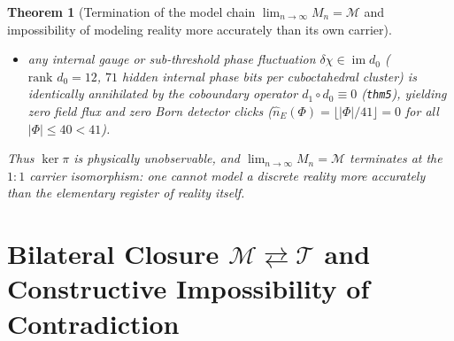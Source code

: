 \documentclass[11pt,a4paper]{article}
\newtheorem{theorem}{Theorem}[section]
\theoremstyle{definition}
\theoremstyle{remark}
\begin{document}
\begin{theorem}[Termination of the model chain $\lim_{n\to\infty} M_n = \mathcal{M}$ and impossibility of modeling reality more accurately than its own carrier]
\begin{enumerate}[label=\textbf{(\roman*)},leftmargin=*]
\begin{itemize}[noitemsep]
  \item any internal gauge or sub-threshold phase fluctuation $\delta\chi \in \operatorname{im} d_0$ ($\text{rank } d_0 = 12$, $71$ hidden internal phase bits per cuboctahedral cluster) is identically annihilated by the coboundary operator $d_1\circ d_0 \equiv 0$ (\texttt{thm5}), yielding zero field flux and zero Born detector clicks ($\hat{n}_E(\Phi) = \lfloor|\Phi|/41\rfloor = 0$ for all $|\Phi|\le 40 < 41$).
  \end{itemize}
  Thus $\ker\pi$ is physically unobservable, and $\lim_{n\to\infty} M_n = \mathcal{M}$ terminates at the $1:1$ carrier isomorphism: \emph{one cannot model a discrete reality more accurately than the elementary register of reality itself}.
\end{enumerate}
\end{theorem}

\section{Bilateral Closure $\mathcal{M} \rightleftarrows \mathcal{T}$ and Constructive Impossibility of Contradiction}
\label{sec:bilateral-closure}
\end{document}
